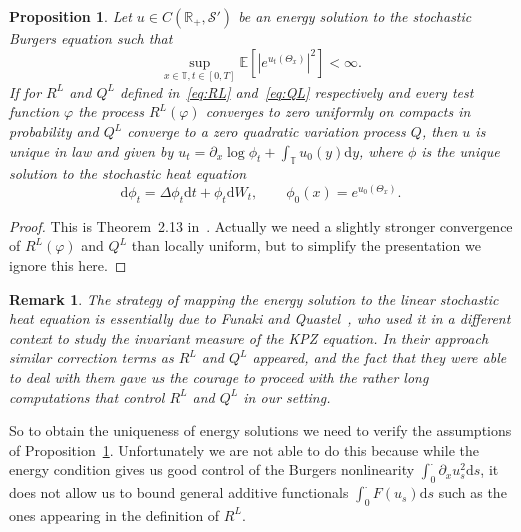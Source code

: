 \documentclass[a4paper,11pt]{article}
\newcommand{\cdummy}{\cdot}
\newcommand{\mathd}{\mathrm{d}}
\newtheorem{remark}[theorem]{Remark}
\newtheorem{proposition}[theorem]{Proposition}
\newcommand{\CS}{\mathscr{S}}
\newcommand{\T}{\mathbb{T}}
\newcommand{\1}{\mathds{1}}
\newcommand{\dd}{\mathrm{d}}
\begin{document}
\begin{proposition}\label{prop:uniqueness}
   Let $u \in C (\mathbb{R}_+, \CS')$ be an
  energy solution to the stochastic Burgers equation such that
    \begin{equation}\label{eq:exp-control} \sup_{x \in \T, t \in [0,T]} \mathbb{E} [|e^{u_t(\Theta_x)}|^2] < \infty. \end{equation}
   If for $R^L$ and $Q^L$ defined in~\eqref{eq:RL} and~\eqref{eq:QL} respectively and every test function $\varphi$ the process $R^L(\varphi)$ converges to zero uniformly on compacts in probability and $Q^L$ converge to a zero quadratic variation process $Q$, then $u$ is unique in law and given by $u_t = \partial_x \log \phi_t + \int_\T u_0(y) \dd y$, where $\phi$ is the unique solution to the stochastic heat equation
  \[
     \dd \phi_t = \Delta \phi_t \dd t + \phi_t \dd W_t, \qquad \phi_0(x) = e^{u_0(\Theta_x)}.
  \]
\end{proposition}

\begin{proof}
  This is Theorem~2.13 in~{\cite{GP16}}. Actually we need a slightly stronger convergence of $R^L(\varphi)$ and $Q^L$ than locally uniform, but to simplify the presentation we ignore this here.
\end{proof}

\begin{remark}
  The strategy of mapping the energy solution to the linear stochastic heat equation is
  essentially due to Funaki and Quastel~\cite{FQ15}, who used it in a different context to study the invariant measure of the KPZ equation. In their approach
  similar correction terms as $R^L$ and $Q^L$ appeared, and the fact
  that they were able to deal with them gave us the courage to proceed with
  the rather long computations that control $R^L$ and $Q^L$ in our setting.
\end{remark}

So to obtain the uniqueness of energy solutions we need to verify the
assumptions of Proposition~\ref{prop:uniqueness}. Unfortunately we are not able to do
this because while the energy condition gives us good control of the Burgers
nonlinearity $\int_0^{\cdummy} \partial_x u_s^2 \mathd s$, it does not allow
us to bound general additive functionals $\int_0^{\cdummy} F (u_s) \mathd s$
such as the ones appearing in the definition of $R^L$.
\end{document}
